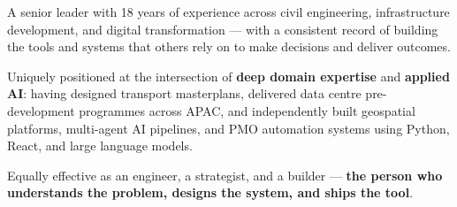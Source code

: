 \par\smallskip
A senior leader with 18 years of experience across civil engineering, infrastructure development, and digital transformation — with a consistent record of building the tools and systems that others rely on to make decisions and deliver outcomes.

\par\smallskip
Uniquely positioned at the intersection of \textbf{deep domain expertise} and \textbf{applied AI}: having designed transport masterplans, delivered data centre pre-development programmes across APAC, and independently built geospatial platforms, multi-agent AI pipelines, and PMO automation systems using Python, React, and large language models.

\par\smallskip
Equally effective as an engineer, a strategist, and a builder — \textbf{the person who understands the problem, designs the system, and ships the tool}.
